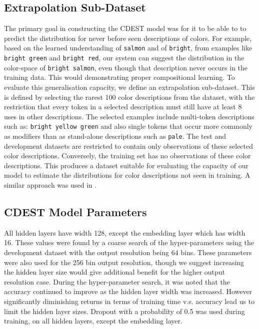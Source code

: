 \documentclass[11pt,a4paper]{article}
\newcommand{\parencite}{\citep}
\newcommand{\textcite}{\citet}
\begin{document}
\subsection{Extrapolation Sub-Dataset} \label{sec:extrapodataset}
The primary goal in constructing the CDEST model was for it to be able to to predict the distribution for never before seen descriptions of colors.
For example, based on the learned understanding of \texttt{salmon} and of \texttt{bright}, from examples like \texttt{bright green} and \texttt{bright red}, our system can suggest the distribution in the color-space of \texttt{bright salmon}, even though that description never occurs in the training data.
This would demonstrating proper compositional learning.
%
To evaluate this generalisation capacity, we define an extrapolation sub-dataset.
This is defined by selecting the rarest 100 color descriptions from the dataset,
with the restriction that every token in a selected description must still have at least 8 uses in other descriptions.
The selected examples include multi-token descriptions such as: \texttt{bright yellow green} and also single tokens that occur more commonly as modifiers than as stand-alone descriptions such as \texttt{pale}.
The test and development datasets are restricted to contain only observations of these selected color descriptions.
Conversely, the training set has no observations of these color descriptions.
This produces a dataset suitable for evaluating the capacity of our model to estimate the distributions for color descriptions not seen in training.
A similar approach was used in \textcite{DBLP:journals/corr/AtzmonBKGC16}.

\subsection{CDEST Model Parameters}
All hidden layers have width 128, except the embedding layer which has width 16.
These values were found by a coarse search of the hyper-parameters using the development dataset with the output resolution being 64 bins.
These parameters were also used for the 256 bin output resolution, though we suggest increasing the hidden layer size would give additional benefit for the higher output resolution case.
During the hyper-parameter search, it was noted that the accuracy continued to improve as the hidden layer width was increased.
However significantly diminishing returns in terms of training time v.s. accuracy lead us to limit the hidden layer sizes.
Dropout \parencite{srivastava2014dropout} with a probability of 0.5 was used during training, on all hidden layers, except the embedding layer.
\end{document}
